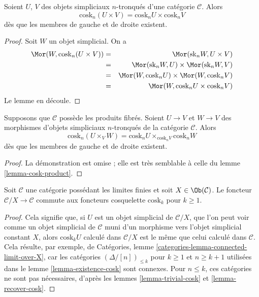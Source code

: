 \begin{lemma}
\label{lemma-cosk-product}
Soient $U$, $V$ des objets simpliciaux $n$-tronqués d'une catégorie
$\mathcal{C}$. Alors
$$
\text{cosk}_n (U \times V) = \text{cosk}_nU \times \text{cosk}_nV
$$
dès que les membres de gauche et de droite existent.
\end{lemma}

\begin{proof}
Soit $W$ un objet simplicial. On a
\begin{eqnarray*}
\Mor(W, \text{cosk}_n (U \times V))
& = &
\Mor(\text{sk}_n W, U \times V) \\
& = &
\Mor(\text{sk}_n W, U)
\times
\Mor(\text{sk}_nW, V) \\
& = &
\Mor(W, \text{cosk}_n U)
\times
\Mor(W, \text{cosk}_n V) \\
& = &
\Mor(W, \text{cosk}_n U \times \text{cosk}_n V)
\end{eqnarray*}
Le lemme en découle.
\end{proof}

\begin{lemma}
\label{lemma-cosk-fibre-product}
Supposons que $\mathcal{C}$ possède les produits fibrés. Soient
$U \to V$ et $W \to V$ des morphismes d'objets simpliciaux $n$-tronqués
de la catégorie $\mathcal{C}$. Alors
$$
\text{cosk}_n (U \times_V W)
=
\text{cosk}_nU \times_{\text{cosk}_n V} \text{cosk}_nW
$$
dès que les membres de gauche et de droite existent.
\end{lemma}

\begin{proof}
La démonstration est omise ; elle est très semblable à celle du lemme
\ref{lemma-cosk-product}.
\end{proof}

\begin{lemma}
\label{lemma-cosk-above-object}
Soit $\mathcal{C}$ une catégorie possédant les limites finies et soit
$X \in \Ob(\mathcal{C})$. Le foncteur $\mathcal{C}/X \to \mathcal{C}$
commute aux foncteurs cosquelette $\text{cosk}_k$ pour $k \geq 1$.
\end{lemma}

\begin{proof}
Cela signifie que, si $U$ est un objet simplicial de $\mathcal{C}/X$,
que l'on peut voir comme un objet simplicial de $\mathcal{C}$ muni d'un
morphisme vers l'objet simplicial constant $X$, alors
$\text{cosk}_k U$ calculé dans $\mathcal{C}/X$ est le même que celui
calculé dans $\mathcal{C}$. Cela résulte, par exemple, de Catégories,
lemme \ref{categories-lemma-connected-limit-over-X}, car les catégories
$(\Delta/[n])_{\leq k}$ pour $k \geq 1$ et $n \geq k + 1$ utilisées dans
le lemme \ref{lemma-existence-cosk} sont connexes. Pour $n \leq k$, ces
catégories ne sont pas nécessaires, d'après les lemmes
\ref{lemma-trivial-cosk} et \ref{lemma-recover-cosk}.
\end{proof}

